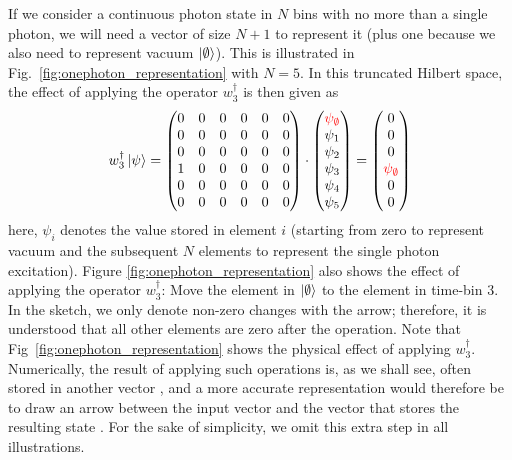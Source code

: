 If we consider a continuous photon state in $N$ bins with no more than a single photon, we will need a vector of size $N+1$ to represent it (plus one because we also need to represent vacuum $\ket{\emptyset}$). This is illustrated in Fig.~\ref{fig:onephoton_representation} with $N=5$. In this truncated Hilbert space, the effect of applying the operator $w_3^\dagger$ is then given as
\begin{equation}
    w_3^\dagger \ket{\psi} = \begin{pmatrix}
        0 & 0 & 0 & 0 & 0 & 0 \\
        0 & 0 & 0 & 0 & 0 & 0 \\
        0 & 0 & 0 & 0 & 0 & 0 \\
        1 & 0 & 0 & 0 & 0 & 0 \\
        0 & 0 & 0 & 0 & 0 & 0 \\
        0 & 0 & 0 & 0 & 0 & 0 \\
    \end{pmatrix} \cdot \begin{pmatrix}
        \textcolor{red}{\psi_\emptyset} \\
        \psi_1 \\
        \psi_2 \\
        \psi_3 \\
        \psi_4 \\
        \psi_5
    \end{pmatrix} = \begin{pmatrix}
        0 \\
        0 \\
        0 \\
        \textcolor{red}{\psi_\emptyset} \\
        0 \\
        0
    \label{eq:operator_matrix} \end{pmatrix} 
\end{equation}
here, $\psi_i$ denotes the value stored in element $i$ (starting from zero to represent vacuum and the subsequent $N$ elements to represent the single photon excitation). Figure \ref{fig:onephoton_representation} also shows the effect of applying the operator $w_3^\dagger$: Move the element in $\ket{\emptyset}$ to the element in time-bin $3$. In the sketch, we only denote non-zero changes with the arrow; therefore, it is understood that all other elements are zero after the operation. Note that Fig~\ref{fig:onephoton_representation} shows the physical effect of applying $w_3^\dagger$. Numerically, the result of applying such operations is, as we shall see, often stored in another vector , and a more accurate representation would therefore be to draw an arrow between the input vector  and the vector that stores the resulting state . For the sake of simplicity, we omit this extra step in all illustrations.  
